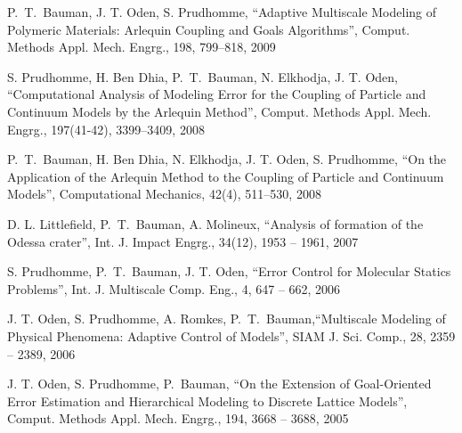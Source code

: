 \blankline

P.~T.~Bauman, J. T. Oden, S. Prudhomme, ``Adaptive Multiscale Modeling
of Polymeric Materials: Arlequin Coupling and Goals Algorithms'',
Comput. Methods Appl. Mech. Engrg., 198, 799--818, 2009

\blankline

S. Prudhomme, H. Ben Dhia, P.~T.~Bauman, N. Elkhodja, J. T. Oden,
``Computational Analysis of Modeling Error for the Coupling of
Particle and Continuum Models by the Arlequin Method'',
Comput. Methods Appl. Mech. Engrg., 197(41-42), 3399--3409, 2008


\blankline

P.~T.~Bauman, H. Ben Dhia, N. Elkhodja, J. T. Oden, S. Prudhomme, ``On
the Application of the Arlequin Method to the Coupling of Particle and
Continuum Models'', Computational Mechanics, 42(4), 511--530, 2008

\blankline


D. L. Littlefield, P.~T.~Bauman, A. Molineux, ``Analysis of formation
of the Odessa crater'', Int. J. Impact Engrg., 34(12), 1953 -- 1961,
2007

\blankline

S. Prudhomme, P.~T.~Bauman, J. T. Oden, ``Error Control for Molecular
Statics Problems'', Int. J. Multiscale Comp. Eng., 4, 647 -- 662,
2006

\blankline

J. T. Oden, S. Prudhomme, A. Romkes, P.~T.~Bauman,``Multiscale
Modeling of Physical Phenomena: Adaptive Control of Models'', SIAM
J. Sci. Comp., 28, 2359 -- 2389, 2006

\blankline

J. T. Oden, S. Prudhomme, P.~Bauman, ``On the Extension of
Goal-Oriented Error Estimation and Hierarchical Modeling to Discrete
Lattice Models'', Comput. Methods Appl. Mech. Engrg., 194, 3668 --
3688, 2005



